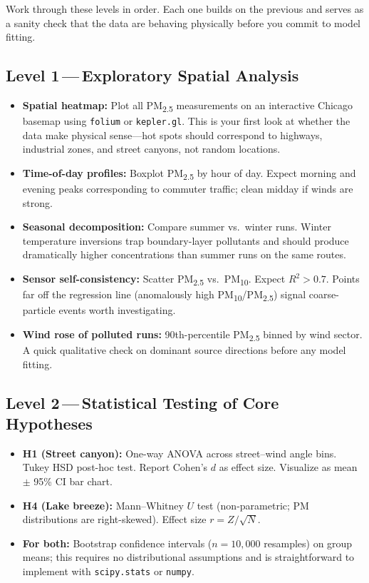 \documentclass[11pt, letterpaper]{article}
\begin{document}
Work through these levels in order. Each one builds on the previous and serves as a sanity check
that the data are behaving physically before you commit to model fitting.

\subsection{Level 1\,---\,Exploratory Spatial Analysis}
\begin{itemize}
  \item \textbf{Spatial heatmap:} Plot all PM\textsubscript{2.5} measurements on an interactive Chicago basemap using \texttt{folium} or \texttt{kepler.gl}. This is your first look at whether the data make physical sense---hot spots should correspond to highways, industrial zones, and street canyons, not random locations.
  \item \textbf{Time-of-day profiles:} Boxplot PM\textsubscript{2.5} by hour of day. Expect morning and evening peaks corresponding to commuter traffic; clean midday if winds are strong.
  \item \textbf{Seasonal decomposition:} Compare summer vs.\ winter runs. Winter temperature inversions trap boundary-layer pollutants and should produce dramatically higher concentrations than summer runs on the same routes.
  \item \textbf{Sensor self-consistency:} Scatter PM\textsubscript{2.5} vs.\ PM\textsubscript{10}. Expect $R^2 > 0.7$. Points far off the regression line (anomalously high PM\textsubscript{10}/PM\textsubscript{2.5}) signal coarse-particle events worth investigating.
  \item \textbf{Wind rose of polluted runs:} 90th-percentile PM\textsubscript{2.5} binned by wind sector. A quick qualitative check on dominant source directions before any model fitting.
\end{itemize}

\subsection{Level 2\,---\,Statistical Testing of Core Hypotheses}
\begin{itemize}
  \item \textbf{H1 (Street canyon):} One-way ANOVA across street--wind angle bins. Tukey HSD post-hoc test. Report Cohen's $d$ as effect size. Visualize as mean $\pm$ 95\% CI bar chart.
  \item \textbf{H4 (Lake breeze):} Mann--Whitney $U$ test (non-parametric; PM distributions are right-skewed). Effect size $r = Z/\sqrt{N}$.
  \item \textbf{For both:} Bootstrap confidence intervals ($n = 10{,}000$ resamples) on group means; this requires no distributional assumptions and is straightforward to implement with \texttt{scipy.stats} or \texttt{numpy}.
\end{itemize}
\end{document}
